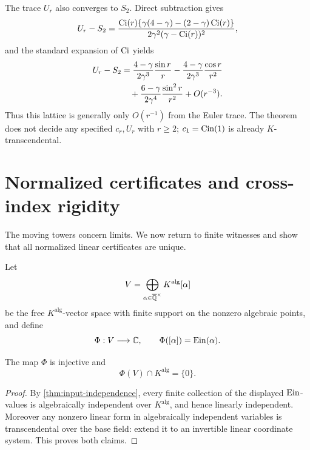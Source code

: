 The trace \(U_r\) also converges to \(S_2\).  Direct subtraction gives
\begin{equation}\label{eq:Ur-S2-exact}
 U_r-S_2=
 \frac{\operatorname{Ci}(r)\{\gamma(4-\gamma)-(2-\gamma)\operatorname{Ci}(r)\}}
 {2\gamma^2(\gamma-\operatorname{Ci}(r))^2},
\end{equation}
and the standard expansion of \(\operatorname{Ci}\) yields
\begin{align}
 U_r-S_2
 &=\frac{4-\gamma}{2\gamma^3}\frac{\sin r}{r}
 -\frac{4-\gamma}{2\gamma^3}\frac{\cos r}{r^2}\notag\\
 &\quad+
 \frac{6-\gamma}{2\gamma^4}\frac{\sin^2r}{r^2}
 +O(r^{-3}).\label{eq:Ur-S2-asymptotic}
\end{align}
Thus this lattice is generally only \(O(r^{-1})\) from the Euler trace.
The theorem does not decide any specified \(c_r,U_r\) with \(r\ge2\);
\(c_1=\operatorname{Cin}(1)\) is already \(K\)-transcendental.

\section{Normalized certificates and cross-index rigidity}
\label{sec:certificates}

The moving towers concern limits.  We now return to finite witnesses and
show that all normalized linear certificates are unique.

Let
\[
 V=\bigoplus_{\alpha\in\overline{\mathbb Q}^\times}K^{\mathrm{alg}}[\alpha]
\]
be the free \(K^{\mathrm{alg}}\)-vector space with finite support on the
nonzero algebraic points, and define
\[
 \Phi:V\longrightarrow\mathbb C,
 \qquad \Phi([\alpha])=\operatorname{Ein}(\alpha).
\]

\begin{lemma}
\label{lem:evaluation-intersection}
The map \(\Phi\) is injective and
\begin{equation}\label{eq:Phi-intersection}
 \Phi(V)\cap K^{\mathrm{alg}}=\{0\}.
\end{equation}
\end{lemma}

\begin{proof}
By \cref{thm:input-independence}, every finite collection of the displayed
\(\operatorname{Ein}\)-values is algebraically independent over \(K^{\mathrm{alg}}\), and
hence linearly independent.  Moreover any nonzero linear form in
algebraically independent variables is transcendental over the base field:
extend it to an invertible linear coordinate system.  This proves both
claims.
\end{proof}

